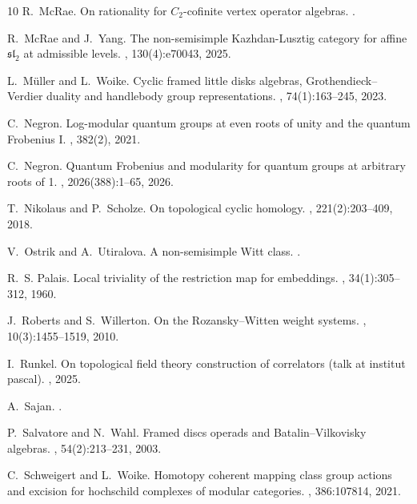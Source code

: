 \documentclass[reqno]{amsart}
\theoremstyle{definition}
\renewcommand{\1}{\mathbf{1}}
\begin{document}
\begin{thebibliography}{10}
R.~McRae.
\newblock On rationality for ${C}_2 $-cofinite vertex operator algebras.
.

R.~McRae and J.~Yang.
\newblock The non-semisimple {K}azhdan-{L}usztig category for affine
  $\mathfrak{sl}_2 $ at admissible levels.
, 130(4):e70043, 2025.

L.~M{\"u}ller and L.~Woike.
\newblock Cyclic framed little disks algebras, {G}rothendieck--{V}erdier
  duality and handlebody group representations.
, 74(1):163--245, 2023.

C.~Negron.
\newblock Log-modular quantum groups at even roots of unity and the quantum
  {F}robenius {I}.
, 382(2), 2021.

C.~Negron.
\newblock Quantum {F}robenius and modularity for quantum groups at arbitrary
  roots of 1.
, 2026(388):1--65, 2026.

T.~Nikolaus and P.~Scholze.
\newblock On topological cyclic homology.
, 221(2):203--409, 2018.

V.~Ostrik and A.~Utiralova.
\newblock A non-semisimple {W}itt class.
.

R.~S. Palais.
\newblock Local triviality of the restriction map for embeddings.
, 34(1):305--312, 1960.

J.~Roberts and S.~Willerton.
\newblock On the {R}ozansky--{W}itten weight systems.
, 10(3):1455--1519, 2010.

I.~Runkel.
\newblock On topological field theory construction of correlators (talk at
  institut pascal).
, 2025.

A.~Sajan.
.

P.~Salvatore and N.~Wahl.
\newblock Framed discs operads and {B}atalin--{V}ilkovisky algebras.
, 54(2):213--231, 2003.

C.~Schweigert and L.~Woike.
\newblock Homotopy coherent mapping class group actions and excision for
  hochschild complexes of modular categories.
, 386:107814, 2021.


\end{thebibliography}
\end{document}

